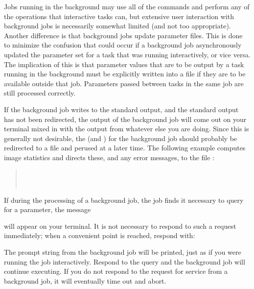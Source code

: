 Jobs running in the background may use all of the commands and
perform any of the operations that interactive tasks can, but
extensive user interaction with background jobs is necessarily 
somewhat limited (and not too appropriate).  
Another difference is that background jobs  update
parameter  files.  This is done to minimize the 
confusion that could occur if a background job asynchronously
updated the parameter set for a task that was running interactively,
or vice versa.  The implication of this is that parameter values that
are to be output by a task running in the background must be explicitly
written into a file if they are to be available outside that job.  
Parameters passed between tasks in the same job are still processed 
correctly.

If the background job writes to the standard
output, and the standard output has not been redirected, the output of
the background job will come out on your terminal mixed in with the output
from whatever else you are doing. Since this is generally not desirable, the
 (and )
for the background job should probably be redirected to a
file and perused at a later time.  The following example computes image
statistics and directs these, and any error messages, to the file
: 

\begin{quotation}\noindent
{}  \\
\comptype{[2]} \\
\end{quotation}

If during the processing of a background job, the job finds it necessary to
query for a parameter, the message

\begin{quotation}\noindent
{}
\end{quotation}

\noindent
will appear on your terminal.  It is not necessary to respond to such a
request immediately; when a convenient point is reached, respond with:

\begin{quotation}\noindent
{} 
\end{quotation}

\noindent
The prompt string from the background job will be printed, just as if
you were running the job interactively.  Respond to the query and the
background job will continue executing.  If you do not respond to the request
for service from a background job, it will eventually time out and abort.

